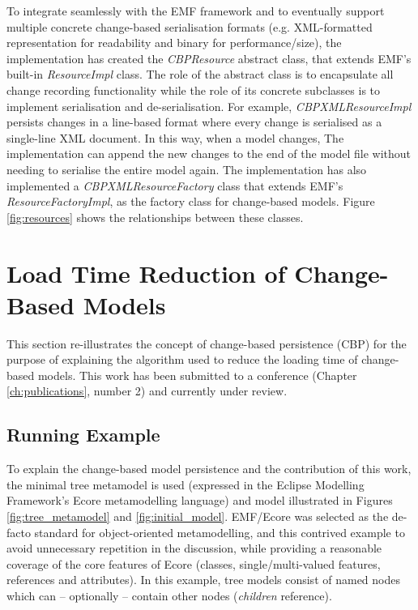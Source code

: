 \documentclass[12pt, a4paper]{report} \usepackage[titletoc]{appendix}
\begin{document}
To integrate seamlessly with the EMF framework and to eventually support multiple concrete change-based serialisation formats (e.g. XML-formatted representation for readability and binary for performance/size), the implementation has created the \emph{CBPResource} abstract class, that extends EMF's built-in \emph{ResourceImpl} class. The role of the abstract class is to encapsulate all change recording functionality while the role of its concrete subclasses is to implement serialisation and de-serialisation. For example, \emph{CBPXMLResourceImpl} persists changes in a line-based format where every change is serialised as a single-line XML document. In this way, when a model changes, The implementation can append the new changes to the end of the model file without needing to serialise the entire model again. The implementation has also implemented a \emph{CBPXMLResourceFactory} class that extends EMF's \emph{ResourceFactoryImpl}, as the factory class for change-based models. Figure \ref{fig:resources} shows the relationships between these classes.

\section{Load Time Reduction of Change-Based Models}
\label{sec:load_time_reduction_of_change-based_models}
This section re-illustrates the concept of change-based persistence (CBP) for the purpose of explaining the algorithm used to reduce the loading time of change-based models. This work has been submitted to a conference (Chapter \ref{ch:publications}, number 2) and currently under review. 

\subsection{Running Example}
\label{subsec:case_study}
To explain the change-based model persistence and the contribution of this work, the minimal tree metamodel is used (expressed in the Eclipse Modelling Framework's Ecore metamodelling language) and model illustrated in Figures \ref{fig:tree_metamodel} and \ref{fig:initial_model}. EMF/Ecore was selected as the de-facto standard for object-oriented metamodelling, and this contrived example to avoid unnecessary repetition in the discussion, while providing a reasonable coverage of the core features of Ecore (classes, single/multi-valued features, references and attributes). In this example, tree models consist of named nodes which can -- optionally -- contain other nodes (\emph{children} reference).
\end{document}
